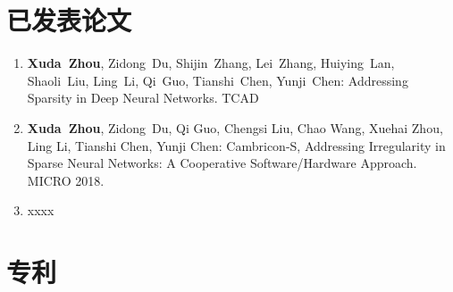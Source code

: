 ﻿\begin{publications}

\section*{已发表论文}
\begin{enumerate}
\item 
\textbf{Xuda~Zhou}, Zidong~Du, Shijin~Zhang, Lei~Zhang, Huiying~Lan, Shaoli~Liu, Ling~Li, Qi~Guo, Tianshi~Chen, Yunji~Chen: Addressing Sparsity in Deep Neural Networks. TCAD
\item
\textbf{Xuda~Zhou}, Zidong~Du, Qi Guo, Chengsi Liu, Chao Wang, Xuehai Zhou, Ling Li, Tianshi Chen, Yunji Chen: Cambricon-S, Addressing Irregularity in Sparse Neural Networks: A Cooperative Software/Hardware Approach. MICRO 2018.
\item
xxxx
\end{enumerate}


\section*{专利}

\end{publications}
